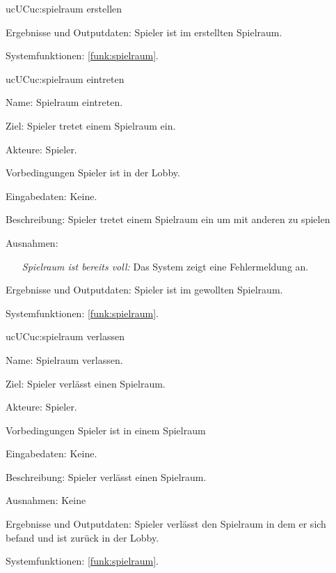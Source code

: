 \begin{description}[leftmargin=5em, style=sameline]
\begin{lhp}{uc}{UC}{uc:spielraum erstellen}
\begin{itemize}
		\end{itemize}
		\item [Ergebnisse und Outputdaten:] Spieler ist im erstellten Spielraum.	
		\item [Systemfunktionen:] \ref{funk:spielraum}.
	\end{lhp}

		\begin{lhp}{uc}{UC}{uc:spielraum eintreten}
		\item [Name:] Spielraum eintreten.
		\item [Ziel:] Spieler tretet einem Spielraum ein.
		\item [Akteure:] Spieler.
		\item [Vorbedingungen] Spieler ist in der Lobby.
		\item [Eingabedaten:] Keine.
		\item [Beschreibung:] Spieler tretet einem Spielraum ein um mit anderen zu spielen
		\item [Ausnahmen:] \hfill
		\begin{itemize} 
			\item[] \textit{Spielraum ist bereits voll:} Das System zeigt eine Fehlermeldung an.
			
		\end{itemize}
		\item [Ergebnisse und Outputdaten:] Spieler ist im gewollten Spielraum.	
		\item [Systemfunktionen:] \ref{funk:spielraum}.
	\end{lhp}


	\begin{lhp}{uc}{UC}{uc:spielraum verlassen}
		\item [Name:] Spielraum verlassen.
		\item [Ziel:] Spieler verlässt einen Spielraum.
		\item [Akteure:] Spieler.
		\item [Vorbedingungen] Spieler ist in einem Spielraum
		\item [Eingabedaten:] Keine.
		\item [Beschreibung:] Spieler verlässt einen Spielraum.
		\item [Ausnahmen:] Keine
		\item [Ergebnisse und Outputdaten:] Spieler verlässt den Spielraum in dem er sich befand und ist zurück in der Lobby.	
		\item [Systemfunktionen:] \ref{funk:spielraum}.
	\end{lhp}


\end{description}
